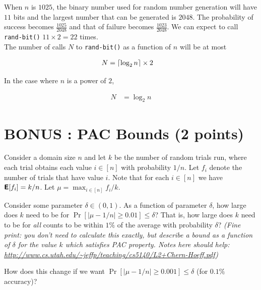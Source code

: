 \documentclass[11pt]{article}
\DeclarePairedDelimiter\ceil{\lceil}{\rceil}
\begin{document}
When $n$ is $1025$, the binary number used for random number generation will have $11$ bits and the largest number that can be generated is $2048$. The probability of success becomes $\frac{1025}{2048}$ and that of failure becomes $\frac{1023}{2048}$. We can expect to call \texttt{rand-bit()} $11 \times 2 = 22$ times.\\

The number of calls $N$ to \texttt{rand-bit()} as a function of $n$ will be at most

\begin{equation*}
\begin{aligned}
N &= \ceil*{\log_2 {n}} \times 2
\end{aligned}
\end{equation*}

In the case where $n$ is a power of $2$, 

\begin{equation*}
\begin{aligned}
N &= \log_2 {n}
\end{aligned}
\end{equation*}

\vspace{-.1in}
\section{BONUS : PAC Bounds (2 points)}

Consider a domain size $n$ and let $k$ be the number of random trials run, where each trial obtains each value $i \in [n]$ with probability $1/n$.  
Let $f_i$ denote the number of trials that have value $i$.  
Note that for each $i \in [n]$ we have $\textbf{\textsf{E}}[f_i] = k/n$.  
Let $\mu = \max_{i \in [n]} f_i/k$.  

Consider some parameter $\delta \in (0,1)$.  
As a function of parameter $\delta$, how large does $k$ need to be for 
$\Pr[ |\mu - 1/n| \geq 0.01] \leq \delta$?
That is, how large does $k$ need to be for \emph{all} counts to be within $1\%$ of the average with probability $\delta$? 
\emph{(Fine print:  you don't need to calculate this exactly, but describe a bound as a function of $\delta$ for the value $k$ which satisfies PAC property.  Notes here should help: \url{http://www.cs.utah.edu/~jeffp/teaching/cs5140/L2+Chern-Hoeff.pdf})}

How does this change if we want
$\Pr[ |\mu - 1/n| \geq 0.001] \leq \delta$ (for $0.1\%$ accuracy)?
\end{document}
